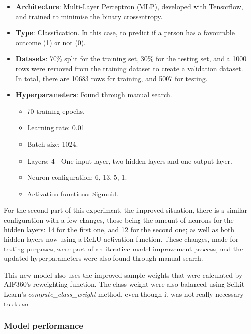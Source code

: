 \documentclass[twoside,11pt]{article}
\begin{document}
\begin{itemize}
        \item \textbf{Architecture}: Multi-Layer Perceptron (MLP), developed with Tensorflow, and trained to minimise the binary crossentropy.
        \item \textbf{Type}: Classification. In this case, to predict if a person has a favourable outcome (1) or not (0).
        \item \textbf{Datasets}: 70\% split for the training set, 30\% for the testing set, and a 1000 rows were removed from the training dataset to create a validation dataset. In total, there are 10683 rows for training, and 5007 for testing.
        \item \textbf{Hyperparameters}: Found through manual search.
            \begin{itemize}
                \item 70 training epochs.
                \item Learning rate: 0.01
                \item Batch size: 1024.
                \item Layers: 4 - One input layer, two hidden layers and one output layer.
                \item Neuron configuration: 6, 13, 5, 1.
                \item Activation functions: Sigmoid.
            \end{itemize}
\end{itemize}

For the second part of this experiment, the improved situation, there is a similar configuration with a few changes, those being the amount of neurons for the hidden layers: 14 for the first one, and 12 for the second one; as well as both hidden layers now using a ReLU activation function. These changes, made for testing purposes, were part of an iterative model improvement process, and the updated hyperparameters were also found through manual search.

This new model also uses the improved sample weights that were calculated by AIF360's reweighting function. The class weight were also balanced using Scikit-Learn's \textit{compute\_class\_weight} method, even though it was not really necessary to do so.

\clearpage

\subsubsection{Model performance}
\end{document}
